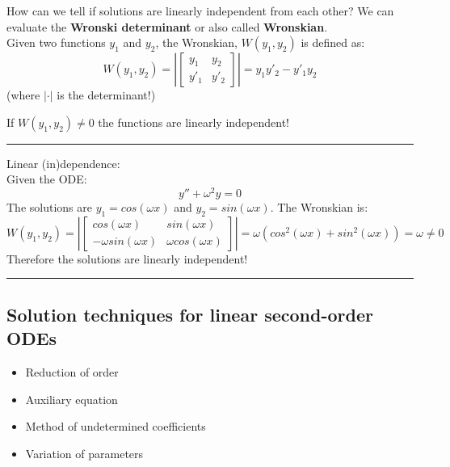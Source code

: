How can we tell if solutions are linearly independent from each other? We can evaluate the \textbf{Wronski determinant} or also called \textbf{Wronskian}.\\

Given two functions $y_1$ and $y_2$, the Wronskian, $W(y_1,y_2)$ is defined as:
\begin{equation*}
W(y_1,y_2)=\left|\begin{bmatrix}
    y_1 & y_2  \\
    y'_1 & y'_2
  \end{bmatrix}\right| = y_1y'_2 -y'_1y_2
\end{equation*}
(where $\left| \cdot \right|$ is the determinant!)

If $W(y_1,y_2)\neq 0$ the functions are linearly independent!
\begin{center}
\noindent\rule{4cm}{0.4pt}
\end{center}

\begin{exmp}{Linear (in)dependence:}\\
Given the ODE:
\begin{equation*}
y''+ \omega^2 y=0
\end{equation*}
The solutions are $y_1=cos(\omega x)$ and $y_2=sin(\omega x)$. The Wronskian is:
\begin{equation*}
W(y_1,y_2)=\left|\begin{bmatrix}
    cos(\omega x) & sin(\omega x)  \\
    -\omega sin(\omega x) & \omega cos(\omega x)
  \end{bmatrix}\right| = \omega(cos^2(\omega x)+sin^2(\omega x))=\omega \neq 0
\end{equation*}
Therefore the solutions are linearly independent!

\end{exmp}

\begin{center}
\noindent\rule{4cm}{0.4pt}
\end{center}

\begin{testv}{}{}
\subsection{Solution techniques for linear second-order ODEs}
\begin{itemize}
\item Reduction of order
\item Auxiliary equation
\item Method of undetermined coefficients
\item Variation of parameters
\end{itemize}
\end{testv}

